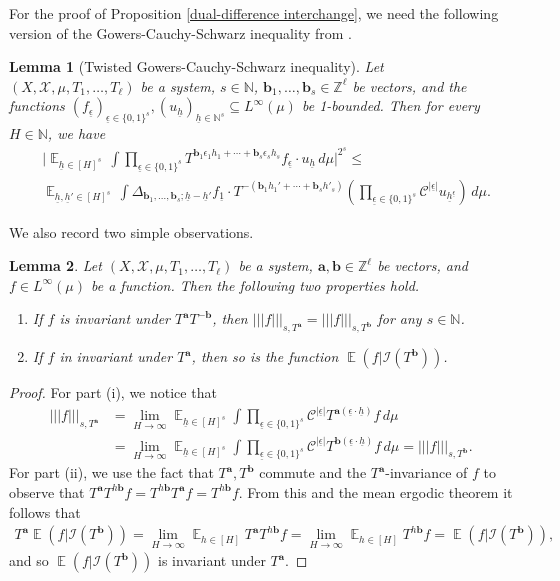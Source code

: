 \documentclass[11pt]{amsart}
\newtheorem{lemma}{Lemma}[section]
\theoremstyle{definition}
\newcommand{\N}{{\mathbb N}}
\newcommand{\Z}{{\mathbb Z}}
\newcommand{\CC}{{\mathcal C}}
\newcommand{\CI}{{\mathcal I}}
\newcommand{\CX}{{\mathcal X}}
\newcommand{\ba}{{\mathbf{a}}}
\renewcommand{\b}{{\textbf{b}}}
\newcommand{\uh}{{\underline{h}}}
\newcommand{\eps}{\epsilon}
\newcommand{\ueps}{{\underline{\epsilon}}}
\newcommand{\nnorm}[1]{\lvert\!|\!| #1|\!|\!\rvert}
\DeclareMathOperator*{\E}{\mathbb{E}}
\begin{document}
For the proof of Proposition \ref{dual-difference interchange}, we need the following version of the Gowers-Cauchy-Schwarz inequality from \cite{FrKu22}.
\begin{lemma}[Twisted Gowers-Cauchy-Schwarz inequality]\label{L:GCS} Let $(X, \CX, \mu,T_1, \ldots, T_\ell)$ be a system, $s\in \N$, $\b_1, \ldots, \b_s\in\Z^\ell$ be vectors, and the functions $(f_\ueps)_{\ueps\in\{0,1\}^s}, (u_\uh)_{\uh\in\N^s} \subseteq L^\infty(\mu)$ be 1-bounded. Then for every $H\in \N$, we have
\begin{align*}
&\Big|\E_{\uh\in [H]^s}\,  \int \prod_{\ueps\in \{0,1\}^s} T^{\b_1 \eps_1 h_1+\cdots+\b_s \eps_s h_s} f_\ueps\cdot u_{\uh}\, d\mu\Big|^{2^s} \leq\\
& \E_{\uh,\uh'\in [H]^s}\,  \int \Delta_{\b_1, \ldots, \b_s; \uh-\uh'}f_{\underline{1}} \cdot T^{-(\b_1 h_1'+\cdots+\b_s h'_s)}\left(\prod_{\ueps\in \{0,1\}^s}\mathcal{C}^{|\ueps|}u_{\uh^\ueps}\right)\, d\mu.
\end{align*}
\end{lemma}

We also record two simple observations.
\begin{lemma}\label{composing invariance}
Let $(X, \CX, \mu,T_1, \ldots, T_\ell)$ be a system, $\ba, \b\in\Z^\ell$ be vectors, and $f\in L^\infty(\mu)$ be a function. Then the following two properties hold.
\begin{enumerate}
    \item If $f$ is invariant under $T^\ba T^{-\b}$, then $\nnorm{f}_{s, T^\ba} = \nnorm{f}_{s, T^\b}$ for any $s\in\N$.
    \item If $f$ in invariant under $T^\ba$, then so is the function $\E(f|\CI(T^\b))$.
\end{enumerate}
\end{lemma}
\begin{proof}
For part (i), we notice that
\begin{align*}
    \nnorm{f}_{s, T^\ba} &= \lim_{H\to\infty}\E_{\uh\in[H]^s}\int \prod_{\ueps\in\{0,1\}^s} \CC^{|\ueps|}T^{\ba(\ueps\cdot \uh)} f\, d\mu\\
    &= \lim_{H\to\infty}\E_{\uh\in[H]^s}\int \prod_{\ueps\in\{0,1\}^s} \CC^{|\ueps|}T^{\b(\ueps\cdot \uh)} f\, d\mu = \nnorm{f}_{s, T^\b}.
\end{align*}
For part (ii), we use the fact that $T^\ba, T^{\b}$ commute and the $T^\ba$-invariance of $f$ to observe that $T^\ba T^{h\b}f =  T^{h\b} T^\ba f = T^{h\b} f$. From this and the mean ergodic theorem it follows that
\begin{align*}
    T^{\ba}\E(f|\CI(T^\b)) = \lim_{H\to\infty}\E_{h\in[H]}T^\ba T^{h\b}f = \lim_{H\to\infty}\E_{h\in[H]}T^{h\b} f = \E(f|\CI(T^\b)),
\end{align*}
and so $\E(f|\CI(T^\b))$ is invariant under $T^\ba$.
\end{proof}
\end{document}
